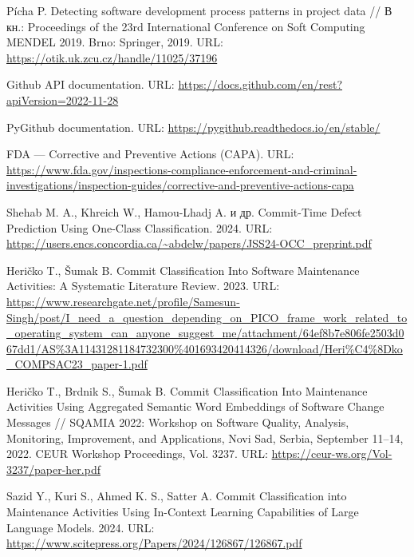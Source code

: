 \begin{thebibliography}{99}
	\label{Picha2019}
	Pícha P.  
	Detecting software development process patterns in project data //  
	В кн.: Proceedings of the 23rd International Conference on Soft Computing MENDEL 2019.  
	Brno: Springer, 2019.  
	URL: \url{https://otik.uk.zcu.cz/handle/11025/37196}
	
	\label{GithubAPI}
	Github API documentation.  
	URL: \url{https://docs.github.com/en/rest?apiVersion=2022-11-28}
	
	\label{PyGithub}
	PyGithub documentation.  
	URL: \url{https://pygithub.readthedocs.io/en/stable/}
	
	\label{FDA}
	FDA — Corrective and Preventive Actions (CAPA).  
	URL: \url{https://www.fda.gov/inspections-compliance-enforcement-and-criminal-investigations/inspection-guides/corrective-and-preventive-actions-capa}
	
	\label{One-Class}
	Shehab M. A., Khreich W., Hamou-Lhadj A. и др.  
	Commit-Time Defect Prediction Using One-Class Classification. 2024.  
	URL: \url{https://users.encs.concordia.ca/~abdelw/papers/JSS24-OCC_preprint.pdf}
	
	\label{Commit-classification}
	Heričko T., Šumak B.  
	Commit Classification Into Software Maintenance Activities: A Systematic Literature Review. 2023.  
	URL: \url{https://www.researchgate.net/profile/Samesun-Singh/post/I_need_a_question_depending_on_PICO_frame_work_related_to_operating_system_can_anyone_suggest_me/attachment/64ef8b7e806fe2503d067dd1/AS%3A11431281184732300%401693420414326/download/Heri%C4%8Dko_COMPSAC23_paper-1.pdf}
	
	\label{Hericko}
	Heričko T., Brdnik S., Šumak B. Commit Classification Into Maintenance Activities Using Aggregated Semantic Word Embeddings of Software Change Messages // SQAMIA 2022: Workshop on Software Quality, Analysis, Monitoring, Improvement, and Applications, Novi Sad, Serbia, September 11–14, 2022. CEUR Workshop Proceedings, Vol. 3237. URL: \url{https://ceur-ws.org/Vol-3237/paper-her.pdf}
	
	\label{Sazid}
	Sazid Y., Kuri S., Ahmed K. S., Satter A.  
	Commit Classification into Maintenance Activities Using In-Context Learning Capabilities of Large Language Models. 2024.  
	URL: \url{https://www.scitepress.org/Papers/2024/126867/126867.pdf}
	
\end{thebibliography}

